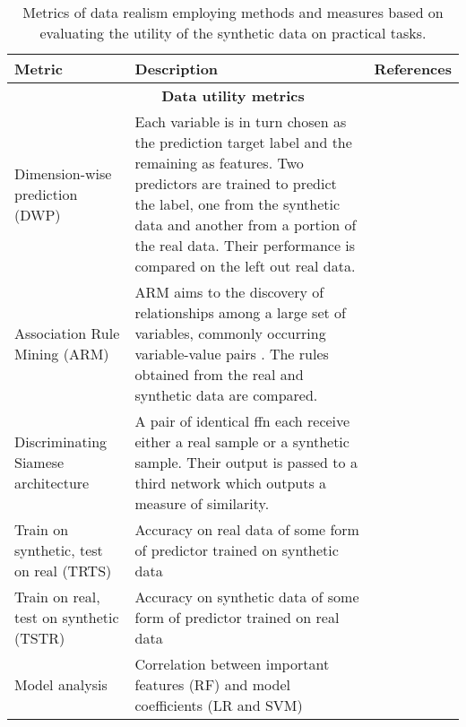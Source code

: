 \begin{table}[H]
        \footnotesize
        \caption{Metrics of data realism employing methods and measures based on evaluating the utility of the synthetic data on practical tasks.}\label{tab:aug-metrics}
        
        \begin{tabularx}{\textwidth}{@{} p{} X p{} @{}} \toprule
        Metric & Description & References\\ \midrule
        
        \multicolumn{3}{c}{\textbf{Data utility metrics}}\\ \midrule
        
        Dimension-wise prediction (DWP) & Each variable is in turn chosen as the prediction target label and the remaining as features. Two predictors are trained to predict the label, one from the synthetic data and another from a portion of the real data. Their performance is compared on the left out real data.  & \cite{Choi2017-nt,Camino2018-re,Goncalves2020,yan2020generating, tanti2019}\\[30pt]
        
        Association Rule Mining (ARM) & ARM aims to the discovery of relationships among a large set of variables, commonly occurring variable-value pairs \cite{Agrawal1993}. The rules obtained from the real and synthetic data are compared.  & \cite{baowaly_2019_IEEE,baowaly_2019_jamia,BaeAnomiGAN2020,yan2020generating}\\[30pt]
        
        Discriminating Siamese architecture & A pair of identical \gls{ffn} each receive either a real sample or a synthetic sample. Their output is passed to a third network which outputs a measure of similarity. & \cite{torfi2019generating}\\[30pt]
        
        Train on synthetic, test on real (TRTS) & Accuracy on real data of some form of predictor trained on synthetic data & \cite{Beaulieu-Jones2019-ct} \\ [30pt]
        
        Train on real, test on synthetic (TSTR) & Accuracy on synthetic data of some form of predictor trained on real data &  \cite{BaeAnomiGAN2020}\\[30pt]
        
        Model analysis & Correlation between important features (RF) and model coefficients (LR and SVM) & \cite{esteban2017real,Xu2019-ay,Yoon2020-anon,chin2019generation}\\[30pt]
        

\end{tabularx}
\end{table}

